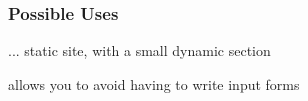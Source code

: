 \documentclass{beamer}
\begin{document}
\begin{frame}[fragile]
  \frametitle{Possible Uses}

... static site, with a small dynamic section

allows you to avoid having to write input forms

% 



\end{frame}




\end{document}
